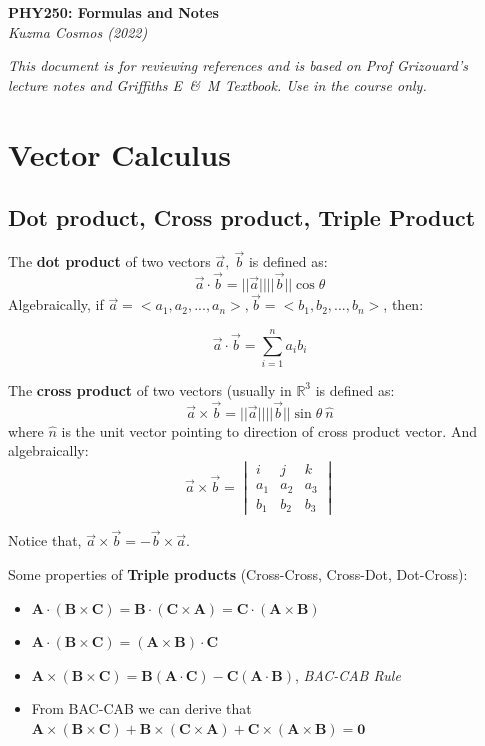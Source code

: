 \documentclass[12pt,a4paper,twoside]{article}
\numberwithin{equation}{section}
\begin{document}
	\begin{center}
		\textbf{\Large{PHY250: Formulas and Notes}}\\
		\textit{Kuzma Cosmos (2022)}
	\end{center}
	\textit{This document is for reviewing references and is based on Prof Grizouard's lecture notes and Griffiths E\ \&\ M Textbook. Use in the course only.}
	\tableofcontents
	\newpage
	
\section{Vector Calculus}
	\subsection{Dot product, Cross product, Triple Product}
	The \textbf{dot product} of two vectors \(\overrightarrow{a},\ \overrightarrow{b}\) is defined as:
	\begin{equation}
		\overrightarrow{a}\cdot \overrightarrow{b}=||\overrightarrow{a}||||\overrightarrow{b}||\cos\theta
	\end{equation}
	Algebraically, if \(\overrightarrow{a}=<a_1, a_2, ..., a_n>,\overrightarrow{b}=<b_1, b_2,..., b_n>\), then:
	
	\[\overrightarrow{a}\cdot \overrightarrow{b}=\sum_{i=1}^n a_ib_i\]
	
	\noindent The \textbf{cross product} of two vectors (usually in \(\mathbb{R}^3\) is defined as:
	\begin{equation}
		\overrightarrow{a}\times \overrightarrow {b}=||\overrightarrow{a}||||\overrightarrow{b}||\sin\theta\ \hat{n}
	\end{equation}
	where \(\hat{n}\) is the unit vector pointing to direction of cross product vector. And algebraically:
	\[\overrightarrow{a}\times \overrightarrow{b}=\begin{vmatrix} i& j &k \\ a_1 &a_2  &a_3 \\b_1  &b_2  &b_3 \end{vmatrix}\]
	
	\noindent Notice that, \(\overrightarrow{a}\times \overrightarrow{b}=-\overrightarrow{b}\times \overrightarrow{a}\).
	
	\noindent Some properties of \textbf{Triple products} (Cross-Cross, Cross-Dot, Dot-Cross):
	\begin{itemize}
		\item \(\textbf{A}\cdot (\textbf{B}\times \textbf{C})= \textbf{B}\cdot (\textbf{C}\times \textbf{A})=\textbf{C}\cdot (\textbf{A}\times \textbf{B})\)
		\item \(\textbf{A}\cdot(\textbf{B}\times \textbf{C})=(\textbf{A}\times \textbf{B})\cdot \textbf{C}\)
		\item \(\textbf{A}\times(\textbf{B}\times \textbf{C})=\textbf{B}(\textbf{A}\cdot \textbf{C})-\textbf{C}(\textbf{A}\cdot \textbf{B})\), \textit{BAC-CAB Rule}
		\item From BAC-CAB we can derive that \(\textbf{A}\times(\textbf{B}\times \textbf{C})+\textbf{B}\times(\textbf{C}\times \textbf{A})+\textbf{C}\times(\textbf{A}\times \textbf{B})=\textbf{0}\)
	\end{itemize}
\end{document}

